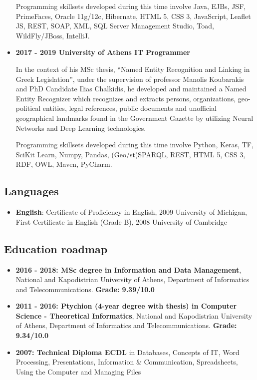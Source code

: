 \documentclass[a4paper,oneside,10pt]{article}
\begin{document}
\begin{itemize}
			Programming skillsets developed during this time involve Java, EJBs, JSF, PrimeFaces, Oracle 11g/12c, Hibernate, HTML 5, CSS 3, JavaScript, Leaflet JS, REST, SOAP, XML, SQL Server Management Studio, Toad, WildFly/JBoss, IntelliJ.

		\item \textbf{2017 - 2019 University of Athens IT Programmer}

			In the context of his MSc thesis, ``Named Entity Recognition and Linking in Greek Legislation'', under the supervision of professor Manolis Koubarakis and PhD Candidate Ilias Chalkidis, he developed and maintained a Named Entity Recognizer which recognizes and extracts persons, organizations, geo-political entities, legal references, public documents and unofficial geographical landmarks found in the Government Gazette by utilizing Neural Networks and Deep Learning technologies.

			Programming skillsets developed during this time involve Python, Keras, TF, SciKit Learn, Numpy, Pandas, (Geo/st)SPARQL, REST, HTML 5, CSS 3, RDF, OWL, Maven, PyCharm.

	\end{itemize}

\subsection*{Languages}

	\begin{itemize}

		\item \textbf{English}: Certificate of Proficiency in English, 2009 University of Michigan, First Certificate in English (Grade B), 2008 University of Cambridge

	\end{itemize}	

\subsection*{Education roadmap}

	\begin{itemize}

		\item \textbf{2016 - 2018: MSc degree in Information and Data Management}, National and Kapodistrian University of Athens, Department of Informatics and Telecommunications. \textbf{Grade: 9.39/10.0}

		\item \textbf{2011 - 2016: Ptychion (4-year degree with thesis) in Computer Science - Theoretical Informatics}, National and Kapodistrian University of Athens, Department of Informatics and Telecommunications. \textbf{Grade: 9.34/10.0}

		\item \textbf{2007: Technical Diploma ECDL} in Databases, Concepts of IT, Word Processing, Presentations, Information \& Communication, Spreadsheets, Using the Computer and Managing Files

	\end{itemize}
\end{document}
